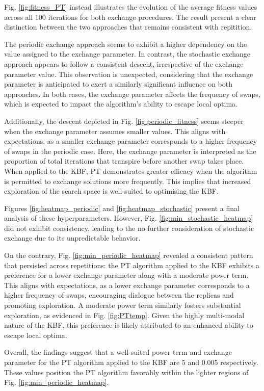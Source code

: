 \documentclass[10pt]{article}
\begin{document}
\begin{multicols}{2}
Fig. \ref {fig:fitness_PT} instead illustrates the evolution of the average fitness values across all 100 iterations for both exchange procedures. The result present a clear distinction between the two approaches that remains consistent with repitition. 

The periodic exchange approach seems to exhibit a higher dependency on the value assigned to the exchange parameter. In contrast, the stochastic exchange approach appears to follow a consistent descent, irrespective of the exchange parameter value. This observation is unexpected, considering that the exchange parameter is anticipated to exert a similarly significant influence on both approaches. In both cases, the exchange parameter affects the frequency of swaps, which is expected to impact the algorithm's ability to escape local optima.

Additionally, the descent depicted in Fig. \ref{fig:periodic_fitness} seems steeper when the exchange parameter assumes smaller values. This aligns with expectations, as a smaller exchange parameter corresponds to a higher frequency of swaps in the periodic case. Here, the exchange parameter is interpreted as the proportion of total iterations that transpire before another swap takes place. When applied to the KBF, PT demonstrates greater efficacy when the algorithm is permitted to exchange solutions more frequently. This implies that increased exploration of the search space is well-suited to optimising the KBF.

Figures \ref{fig:heatmap_periodic} and \ref{fig:heatmap_stochastic} present a final analysis of these hyperparameters. However, Fig. \ref{fig:min_stochastic_heatmap} did not exhibit consistency, leading to the no further consideration of stochastic exchange due to its unpredictable behavior.

On the contrary, Fig. \ref{fig:min_periodic_heatmap} revealed a consistent pattern that persisted across repetitions: the PT algorithm applied to the KBF exhibits a preference for a lower exchange parameter along with a moderate power term. This aligns with expectations, as a lower exchange parameter corresponds to a higher frequency of swaps, encouraging dialogue between the replicas and promoting exploration. A moderate power term similarly fosters substantial exploration, as evidenced in Fig. \ref{fig:PTtemp}. Given the highly multi-modal nature of the KBF, this preference is likely attributed to an enhanced ability to escape local optima.

Overall, the findings suggest that a well-suited power term and exchange parameter for the PT algorithm applied to the KBF are 5 and 0.005 respectively. These values position the PT algorithm favorably within the lighter regions of Fig. \ref{fig:min_periodic_heatmap}.


\end{multicols}
\end{document}

